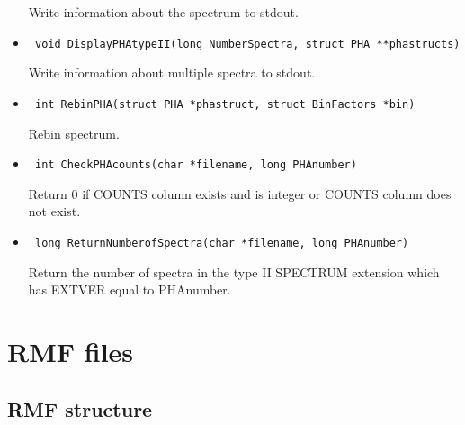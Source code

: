 \documentclass[11pt]{book}
\begin{document}
\begin{itemize}
               Write information about the spectrum to stdout.

\item      \begin{verbatim} void DisplayPHAtypeII(long NumberSpectra, struct PHA **phastructs)\end{verbatim}

               Write information about multiple spectra to stdout.

\item      \begin{verbatim} int RebinPHA(struct PHA *phastruct, struct BinFactors *bin)\end{verbatim}

               Rebin spectrum.

\item      \begin{verbatim} int CheckPHAcounts(char *filename, long PHAnumber)\end{verbatim}

               Return 0 if COUNTS column exists and is integer 
               or COUNTS column does not exist.

\item      \begin{verbatim} long ReturnNumberofSpectra(char *filename, long PHAnumber)\end{verbatim}

               Return the number of spectra in the type II SPECTRUM
               extension which has EXTVER equal to PHAnumber.

\end{itemize}

\section{RMF files}

\subsection{RMF structure}
\end{document}
